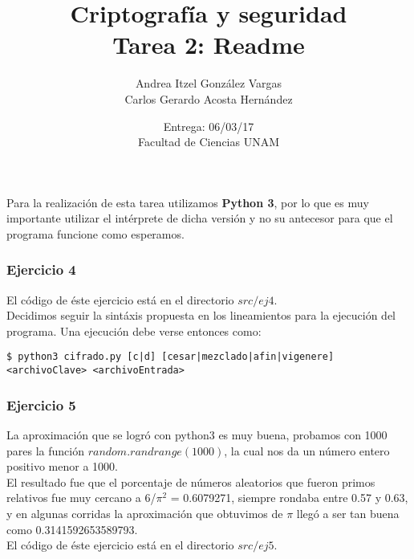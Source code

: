 \documentclass[12pt]{article}
\title{Criptografía y seguridad \\ Tarea 2: Readme}
\author{Andrea Itzel González Vargas \\ Carlos Gerardo Acosta Hernández}
\date{Entrega: 06/03/17 \\ Facultad de Ciencias UNAM}
\begin{document}
\maketitle
Para la realización de esta tarea utilizamos \textbf{Python 3}, por lo que es muy importante utilizar el intérprete de dicha versión y no su antecesor para que el programa funcione como esperamos.

\subsubsection*{Ejercicio 4}
El código de éste ejercicio está en el directorio $src/ej4$. \\
Decidimos seguir la sintáxis propuesta en los lineamientos para la ejecución del programa. Una ejecución debe verse entonces como:
\begin{verbatim}
$ python3 cifrado.py [c|d] [cesar|mezclado|afin|vigenere] <archivoClave> <archivoEntrada>
\end{verbatim}

\subsubsection*{Ejercicio 5}
La aproximación que se logró con python3 es muy buena, probamos con 1000 pares
la función $random.randrange(1000)$, la cual nos da un número entero positivo menor a 1000. \\
El resultado fue que el porcentaje de números aleatorios que fueron primos
relativos fue muy cercano a 6/$\pi^2$ = 0.6079271, siempre rondaba entre 0.57 y 0.63, y en algunas corridas la
aproximación que obtuvimos de $\pi$ llegó a ser tan buena como 0.3141592653589793. \\
El código de éste ejercicio está en el directorio $src/ej5$. \\
\end{document}
